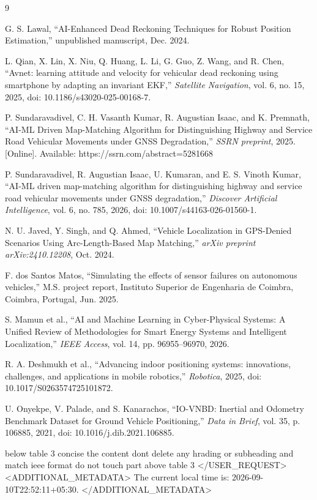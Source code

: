 \begin{thebibliography}{9}

 G. S. Lawal, ``AI-Enhanced Dead Reckoning Techniques for Robust Position Estimation,'' unpublished manuscript, Dec. 2024.

 L. Qian, X. Lin, X. Niu, Q. Huang, L. Li, G. Guo, Z. Wang, and R. Chen, ``Avnet: learning attitude and velocity for vehicular dead reckoning using smartphone by adapting an invariant EKF,'' \emph{Satellite Navigation}, vol. 6, no. 15, 2025, doi: 10.1186/s43020-025-00168-7.

 P. Sundaravadivel, C. H. Vasanth Kumar, R. Augustian Isaac, and K. Premnath, ``AI-ML Driven Map-Matching Algorithm for Distinguishing Highway and Service Road Vehicular Movements under GNSS Degradation,'' \emph{SSRN preprint}, 2025. [Online]. Available: https://ssrn.com/abstract=5281668

 P. Sundaravadivel, R. Augustian Isaac, U. Kumaran, and E. S. Vinoth Kumar, ``AI-ML driven map-matching algorithm for distinguishing highway and service road vehicular movements under GNSS degradation,'' \emph{Discover Artificial Intelligence}, vol. 6, no. 785, 2026, doi: 10.1007/s44163-026-01560-1.

 N. U. Javed, Y. Singh, and Q. Ahmed, ``Vehicle Localization in GPS-Denied Scenarios Using Arc-Length-Based Map Matching,'' \emph{arXiv preprint arXiv:2410.12208}, Oct. 2024.

 F. dos Santos Matos, ``Simulating the effects of sensor failures on autonomous vehicles,'' M.S. project report, Instituto Superior de Engenharia de Coimbra, Coimbra, Portugal, Jun. 2025.

 S. Mamun et al., ``AI and Machine Learning in Cyber-Physical Systems: A Unified Review of Methodologies for Smart Energy Systems and Intelligent Localization,'' \emph{IEEE Access}, vol. 14, pp. 96955--96970, 2026.

 R. A. Deshmukh et al., ``Advancing indoor positioning systems: innovations, challenges, and applications in mobile robotics,'' \emph{Robotica}, 2025, doi: 10.1017/S0263574725101872.

 U. Onyekpe, V. Palade, and S. Kanarachos, ``IO-VNBD: Inertial and Odometry Benchmark Dataset for Ground Vehicle Positioning,'' \emph{Data in Brief}, vol. 35, p. 106885, 2021, doi: 10.1016/j.dib.2021.106885.

\end{thebibliography}

 
below table 3 concise the content dont delete any hrading or subheading and match ieee format do not touch part above table 3
</USER_REQUEST>
<ADDITIONAL_METADATA>
The current local time is: 2026-09-10T22:52:11+05:30.
</ADDITIONAL_METADATA>